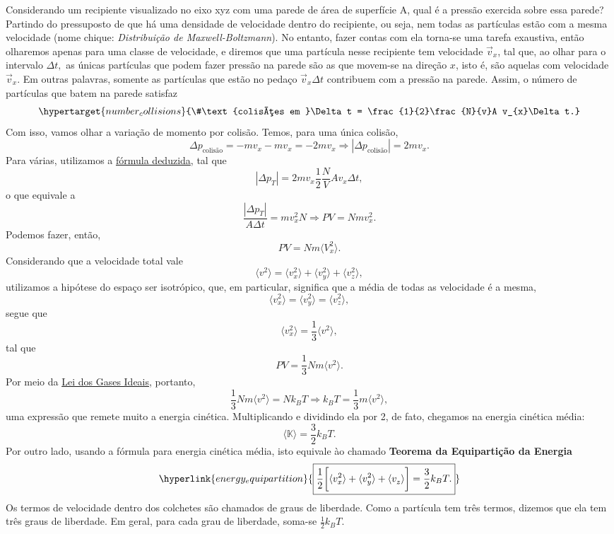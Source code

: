 \documentclass{article}
\begin{document}
Considerando um recipiente visualizado no eixo xyz com uma parede de área de superfície A, qual
é a pressão exercida sobre essa parede? Partindo do pressuposto de que há uma densidade de velocidade 
dentro do recipiente, ou seja, nem todas as partículas estão com a mesma velocidade (nome chique: \textit{Distribuição de
Maxwell-Boltzmann}). No entanto, fazer contas com ela torna-se uma tarefa exaustiva, então olharemos apenas
para uma classe de velocidade, e diremos que uma partícula nesse recipiente tem velocidade \(\vec{v}_{x}\),
tal que, ao olhar para o intervalo \(\Delta t,\) as únicas partículas que podem fazer pressão na parede são
as que movem-se na direção \(x\), isto é, são aquelas com velocidade \(\vec{v}_{x}.\) Em outras palavras,
somente as partículas que estão no pedaço \(\vec{v}_{x}\Delta t\) contribuem com a pressão na parede.
Assim, o número de partículas que batem na parede satisfaz 
\[
  \hypertarget{number_collisions}{\#\text{colisões em }\Delta t = \frac{1}{2}\frac{N}{v}A v_{x}\Delta t.}
\]
Com isso, vamos olhar a variação de momento por colisão. Temos, para uma única colisão,
\[
  \Delta p_{\text{colisão}} = -mv_{x} - mv_{x} = -2mv_{x} \Rightarrow |\Delta p_{\text{colisão}}| = 2mv_{x}.
\]
Para várias, utilizamos a \hyperlink{number_collisions}{fórmula deduzida}, tal que 
\[
  |\Delta p_{T}| = 2mv_{x}\frac{1}{2}\frac{N}{V}Av_{x}\Delta t,
\]
o que equivale a 
\[
  \frac{|\Delta p_{T}|}{A\Delta t} = mv_{x}^{2}N \Rightarrow PV = Nmv_{x}^{2}.
\]
Podemos fazer, então, 
\[
  PV = Nm \langle V_{x}^{2} \rangle.
\]
Considerando que a velocidade total vale 
\[
  \langle v^{2} \rangle = \langle v_{x}^{2} \rangle + \langle v_{y}^{2} \rangle + \langle v_{z}^{2} \rangle,
\]
utilizamos a hipótese do espaço ser isotrópico, que, em particular, significa que a média de todas as velocidade é a mesma,
\[
  \langle v_{x}^{2} \rangle = \langle v_{y}^{2} \rangle = \langle v_{z}^{2} \rangle,
\]
segue que 
\[
  \langle v_{x}^{2} \rangle = \frac{1}{3}\langle v^{2} \rangle,
\]
tal que 
\[
  PV = \frac{1}{3}Nm \langle v^{2} \rangle.
\]
Por meio da \hyperlink{pvnrt}{Lei dos Gases Ideais,} portanto, 
\[
  \frac{1}{3}Nm \langle v^{2} \rangle = Nk_{B}T \Rightarrow k_{B}T = \frac{1}{3}m \langle v^{2} \rangle,
\]
uma expressão que remete muito a energia cinética. Multiplicando e dividindo ela por 2, de fato, chegamos na energia cinética média:
\[
  \langle \mathbb{K} \rangle = \frac{3}{2}k_{B}T.
\]
Por outro lado, usando a fórmula para energia cinética média, isto equivale ào chamado \textbf{Teorema da Equipartição da Energia}
\[
  \hyperlink{energy_equipartition}{\boxed{\frac{1}{2}\biggl[\langle v_{x}^{2} \rangle + \langle v_{y}^{2} \rangle + \langle v_{z}^{} \rangle\biggr] = \frac{3}{2}k_{B}T.}}
\]
Os termos de velocidade dentro dos colchetes são chamados de graus de liberdade. Como a partícula tem três termos, dizemos que ela tem três graus de liberdade.
Em geral, para cada grau de liberdade, soma-se \(\frac{1}{2}k_{B}T.\)
\end{document}
